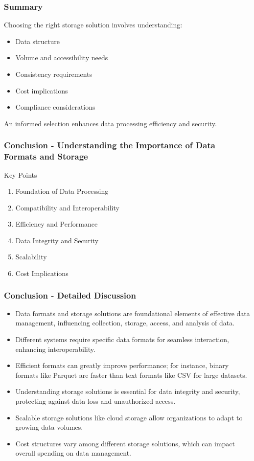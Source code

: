 \documentclass[aspectratio=169]{beamer}
\begin{document}
\begin{frame}[fragile]
    \frametitle{Summary}
    Choosing the right storage solution involves understanding:
    \begin{itemize}
        \item Data structure
        \item Volume and accessibility needs
        \item Consistency requirements
        \item Cost implications
        \item Compliance considerations
    \end{itemize}
    An informed selection enhances data processing efficiency and security.
\end{frame}

\begin{frame}[fragile]
    \frametitle{Conclusion - Understanding the Importance of Data Formats and Storage}
    \begin{block}{Key Points}
        \begin{enumerate}
            \item Foundation of Data Processing
            \item Compatibility and Interoperability
            \item Efficiency and Performance
            \item Data Integrity and Security
            \item Scalability
            \item Cost Implications
        \end{enumerate}
    \end{block}
\end{frame}

\begin{frame}[fragile]
    \frametitle{Conclusion - Detailed Discussion}
    \begin{itemize}
        \item Data formats and storage solutions are foundational elements of effective data management, influencing collection, storage, access, and analysis of data.
        \item Different systems require specific data formats for seamless interaction, enhancing interoperability.
        \item Efficient formats can greatly improve performance; for instance, binary formats like Parquet are faster than text formats like CSV for large datasets.
        \item Understanding storage solutions is essential for data integrity and security, protecting against data loss and unauthorized access.
        \item Scalable storage solutions like cloud storage allow organizations to adapt to growing data volumes.
        \item Cost structures vary among different storage solutions, which can impact overall spending on data management.
    \end{itemize}
\end{frame}
\end{document}
